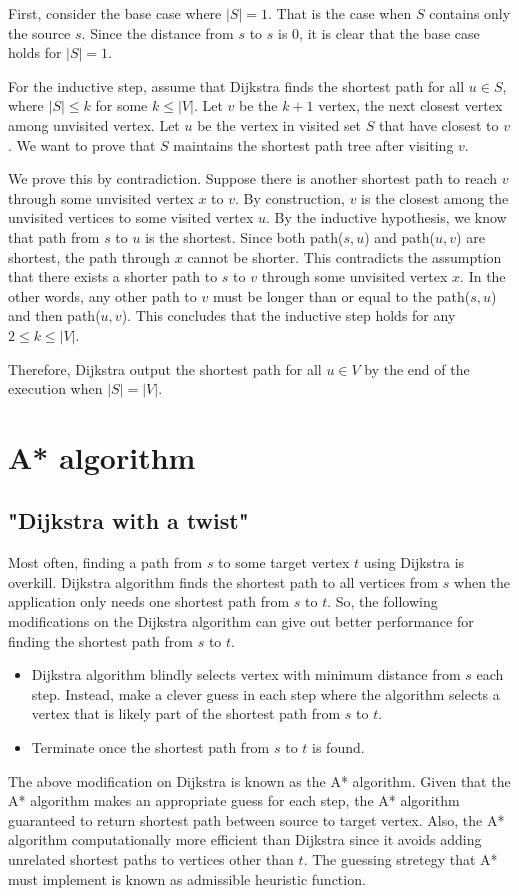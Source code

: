 \documentclass{article}
\begin{document}
First, consider the base case where $|S| = 1$. That is the case when $S$ contains only the source $s$. Since the distance from $s$ to $s$ is 0, it is clear that the base case holds for $|S| = 1$.

For the inductive step, assume that Dijkstra finds the shortest path for all $u \in S$, where $|S| \leq k$ for some $k \leq |V|$. Let $v$ be the $k + 1$ vertex, the next closest vertex among unvisited vertex. Let $u$ be the vertex in visited set $S$ that have closest to $v$. We want to prove that $S$ maintains the shortest path tree after visiting $v$.

We prove this by contradiction. Suppose there is another shortest path to reach $v$ through some unvisited vertex $x$ to $v$. By construction, $v$ is the closest among the unvisited vertices to some visited vertex $u$. By the inductive hypothesis, we know that path from $s$ to $u$ is the shortest. Since both path($s,u$) and path($u,v$) are shortest, the path through $x$ cannot be shorter. This contradicts the assumption that there exists a shorter path to $s$ to $v$ through some unvisited vertex $x$.
In the other words, any other path to $v$ must be longer than or equal to the path($s, u$) and then path($u, v$). This concludes that the inductive step holds for any $2 \leq k \leq |V|$. 

Therefore, Dijkstra output the shortest path for all $u \in V$ by the end of the execution when $|S| = |V|$.


\section{A* algorithm}
\subsection{"Dijkstra with a twist" \cite{Buckland}}
Most often, finding a path from $s$ to some target vertex $t$ using Dijkstra is overkill. Dijkstra algorithm finds the shortest path to all vertices from $s$ when the application only needs one shortest path from $s$ to $t$. So, the following modifications on the Dijkstra algorithm can give out better performance for finding the shortest path from $s$ to $t$. 
\begin{itemize}
    \item Dijkstra algorithm blindly selects vertex with minimum distance from $s$ each step. Instead, make a clever guess in each step where the algorithm selects a vertex that is likely part of the shortest path from $s$ to $t$.\cite{Buckland, HNR}
    \item Terminate once the shortest path from $s$ to $t$ is found.
\end{itemize}
The above modification on Dijkstra is known as the A* algorithm. Given that the A* algorithm makes an appropriate guess for each step, the A* algorithm guaranteed to return shortest path between source to target vertex. Also, the A* algorithm computationally more efficient than Dijkstra since it avoids adding unrelated shortest paths to vertices other than $t$. The guessing stretegy that A* must implement is known as admissible heuristic function.
\end{document}
